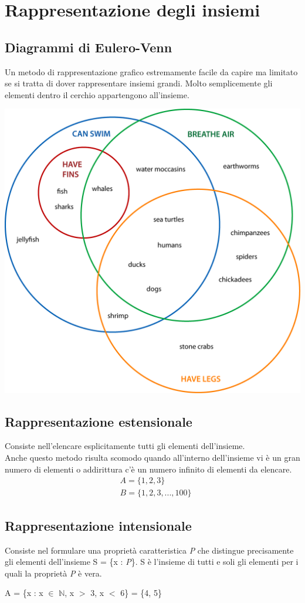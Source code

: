 \section{Rappresentazione degli insiemi}
\subsection{Diagrammi di Eulero-Venn}
Un metodo di rappresentazione grafico estremamente facile da capire ma limitato se si tratta di dover rappresentare insiemi grandi.
Molto semplicemente gli elementi dentro il cerchio appartengono all'insieme. \\
\begin{center}
    \includegraphics[scale=0.60]{Insiemi/venn-diagram1.png}
\end{center}

\subsection{Rappresentazione estensionale}
Consiste nell'elencare esplicitamente tutti gli elementi dell'insieme. \\
Anche questo metodo risulta scomodo quando all'interno dell'insieme vi è un gran numero
di elementi o addirittura c'è un numero infinito di elementi da elencare.
\begin{align*}
    &A = \{1, 2, 3\} \\
    &B = \{1, 2, 3, ..., 100\}
\end{align*}
\subsection{Rappresentazione intensionale}
Consiste nel formulare una proprietà caratteristica \textit{P} che distingue precisamente gli elementi dell'insieme S = \{x : \textit{P}\}. S è l'insieme di tutti e soli gli elementi per i quali la proprietà \textit{P} è vera. \\
\begin{center}
    A = \{x : x $\in$ $\mathbb{N}$, x $>$ 3, x $<$ 6\} = \{4, 5\}
\end{center}
